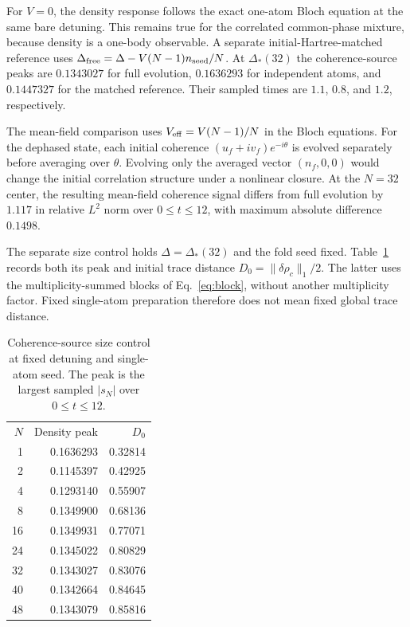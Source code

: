 \documentclass[aps,pra,10pt,onecolumn,superscriptaddress,amsmath,amssymb]{revtex4-2}
\begin{document}
For $V=0$, the density response follows the exact one-atom Bloch equation at the same bare detuning. This remains true for the correlated common-phase mixture, because density is a one-body observable. A separate initial-Hartree-matched reference uses $\Delta_{\rm free}=\Delta-V(N-1)n_{\rm seed}/N$. At $\Delta_*(32)$ the coherence-source peaks are $0.1343027$ for full evolution, $0.1636293$ for independent atoms, and $0.1447327$ for the matched reference. Their sampled times are $1.1$, $0.8$, and $1.2$, respectively.

The mean-field comparison uses $V_{\rm eff}=V(N-1)/N$ in the Bloch equations. For the dephased state, each initial coherence $(u_f+iv_f)e^{-i\theta}$ is evolved separately before averaging over $\theta$. Evolving only the averaged vector $(n_f,0,0)$ would change the initial correlation structure under a nonlinear closure. At the $N=32$ center, the resulting mean-field coherence signal differs from full evolution by $1.117$ in relative $L^2$ norm over $0\le t\le12$, with maximum absolute difference $0.1498$.

The separate size control holds $\Delta=\Delta_*(32)$ and the fold seed fixed. Table~\ref{tab:fixedsize} records both its peak and initial trace distance $D_0=\|\delta\rho_c\|_1/2$. The latter uses the multiplicity-summed blocks of Eq.~\eqref{eq:block}, without another multiplicity factor. Fixed single-atom preparation therefore does not mean fixed global trace distance.
\begin{table}[ht]
\caption{Coherence-source size control at fixed detuning and single-atom seed. The peak is the largest sampled $|s_N|$ over $0\le t\le12$.}
\label{tab:fixedsize}
\begin{ruledtabular}
\begin{tabular}{rrr}
$N$&Density peak&$D_0$\\
1&0.1636293&0.32814\\
2&0.1145397&0.42925\\
4&0.1293140&0.55907\\
8&0.1349900&0.68136\\
16&0.1349931&0.77071\\
24&0.1345022&0.80829\\
32&0.1343027&0.83076\\
40&0.1342664&0.84645\\
48&0.1343079&0.85816
\end{tabular}
\end{ruledtabular}
\end{table}
\end{document}
